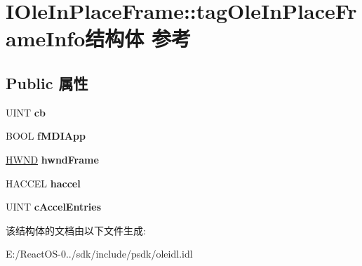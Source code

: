 \hypertarget{struct_i_ole_in_place_frame_1_1tag_ole_in_place_frame_info}{}\section{I\+Ole\+In\+Place\+Frame\+:\+:tag\+Ole\+In\+Place\+Frame\+Info结构体 参考}
\label{struct_i_ole_in_place_frame_1_1tag_ole_in_place_frame_info}
\subsection*{Public 属性}
\begin{DoxyCompactItemize}
\item 
\mbox{\label{struct_i_ole_in_place_frame_1_1tag_ole_in_place_frame_info_afca1deafcbc4a38984b0796052045715}} 
U\+I\+NT {\bfseries cb}
\item 
\mbox{\label{struct_i_ole_in_place_frame_1_1tag_ole_in_place_frame_info_a8aa5441d1dc9726514e6d30c5bce708e}} 
B\+O\+OL {\bfseries f\+M\+D\+I\+App}
\item 
\mbox{\label{struct_i_ole_in_place_frame_1_1tag_ole_in_place_frame_info_a26b720c441c5180199ce0ff5a20c3b6f}} 
\hyperlink{interfacevoid}{H\+W\+ND} {\bfseries hwnd\+Frame}
\item 
\mbox{\label{struct_i_ole_in_place_frame_1_1tag_ole_in_place_frame_info_a6d7b3021aaa3428187468c7310c9b225}} 
H\+A\+C\+C\+EL {\bfseries haccel}
\item 
\mbox{\label{struct_i_ole_in_place_frame_1_1tag_ole_in_place_frame_info_a1ce00ead9fbcb7b4dd8886c018cede35}} 
U\+I\+NT {\bfseries c\+Accel\+Entries}
\end{DoxyCompactItemize}


该结构体的文档由以下文件生成\+:\begin{DoxyCompactItemize}
\item 
E\+:/\+React\+O\+S-\/0../sdk/include/psdk/oleidl.\+idl\end{DoxyCompactItemize}

